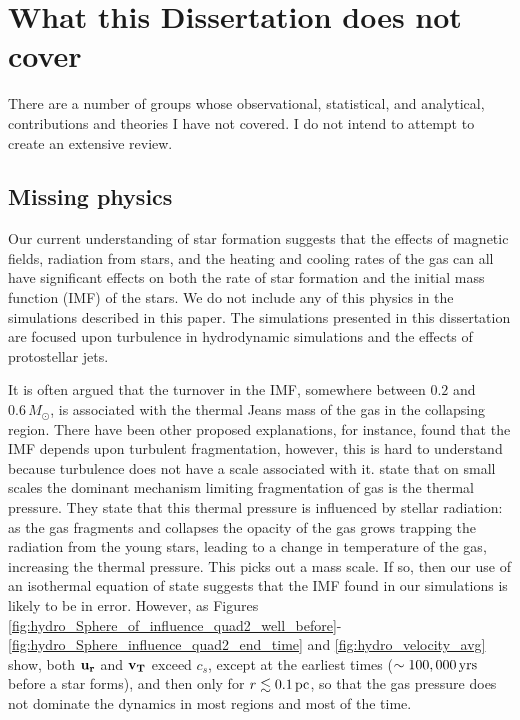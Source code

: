 \documentclass[../dissertation.tex]{subfiles}
\begin{document}
\section{What this Dissertation does not cover}
There are a number of groups whose observational, statistical, and analytical, contributions and theories I have not covered.
I do not intend to attempt to create an extensive review.


\subsection{Missing physics} \label{subsec:missing_physics}
Our current understanding of star formation suggests that the effects of magnetic 
fields, radiation from stars, and the heating and cooling rates of the gas can all have significant effects on both the rate of star formation and the initial 
mass function (IMF) of the stars. 
We do not include any of this physics in the simulations described in this paper. 
The simulations presented in this dissertation are focused upon turbulence in hydrodynamic simulations and the effects of protostellar jets. 

It is often argued that the turnover in the IMF, somewhere between $0.2$ and $0.6\,M_\odot$, 
is associated with the thermal Jeans mass of the gas in the collapsing region. 
There have been other proposed explanations, for instance, 
\citet{2002ApJ...576..870P} found that the IMF depends upon turbulent fragmentation, however, this is hard to understand because turbulence does not have a scale associated with it. 
\citet{2016MNRAS.460.3272K} state that on small scales the dominant mechanism limiting fragmentation of gas is the thermal pressure. 
They state that this thermal pressure is influenced by stellar radiation: as the gas fragments and collapses the opacity of the gas grows trapping the radiation from the young stars, leading to a change in temperature of the gas, increasing the thermal pressure. 
This picks out a mass scale.
If so, then our use of an isothermal equation of state suggests that the IMF found in our simulations is likely to be in error. 
However, as Figures \ref{fig:hydro_Sphere_of_influence_quad2_well_before}-\ref{fig:hydro_Sphere_influence_quad2_end_time} and \ref{fig:hydro_velocity_avg} show, 
both $\mathbf{u_r}$ and $\mathbf{v_T}$ exceed $c_s$, except at the earliest times ($\sim 100,000\,\rm yrs$ before a star forms), and then only for $r\lesssim0.1\,\rm pc$, 
so that the gas pressure does not dominate the dynamics in most regions and most of the time. 
\end{document}
